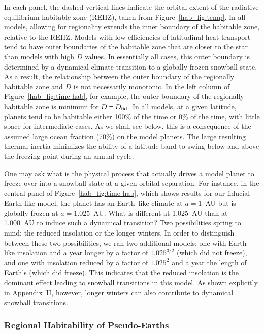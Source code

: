 In each panel, the dashed vertical lines indicate the orbital extent
of the radiative equilibrium habitable zone (REHZ), taken from
Figure~\ref{hab_fig:temp}.  In all models, allowing for regionality
extends the inner boundary of the habitable zone, relative to the
REHZ.  Models with low efficiencies of latitudinal heat transport tend
to have outer boundaries of the habitable zone that are closer to the
star than models with high $D$ values.  In essentially all cases, this
outer boundary is determined by a dynamical climate transition to a
globally-frozen snowball state. As a result, the relationship between
the outer boundary of the regionally habitable zone and $D$ is not
necessarily monotonic.  In the left column of Figure~\ref{hab_fig:time
hab}, for example, the outer boundary of the regionally habitable zone
is minimum for $D=D_{\rm fid}$.  In all models, at a given latitude,
planets tend to be habitable either 100\% of the time or 0\% of the
time, with little space for intermediate cases.  As we shall see
below, this is a consequence of the assumed large ocean fraction
(70\%) on the model planets. The large resulting thermal inertia
minimizes the ability of a latitude band to swing below and above the
freezing point during an annual cycle.

One may ask what is the physical process that actually drives a model
planet to freeze over into a snowball state at a given orbital
separation.  For instance, in the central panel of
Figure~\ref{hab_fig:time hab}, which shows results for our fiducial
Earth-like model, the planet has an Earth--like climate at $a=1$~AU
but is globally-frozen at $a=1.025$~AU.  What is different at 1.025~AU
than at 1.000~AU to induce such a dynamical transition?  Two
possibilities spring to mind: the reduced insolation or the longer
winters.  In order to distinguish between these two possibilities, we
ran two additional models: one with Earth--like insolation and a year
longer by a factor of $1.025^{3/2}$ (which did not freeze), and one
with insolation reduced by a factor of $1.025^2$ and a year the length
of Earth's (which did freeze).  This indicates that the reduced
insolation is the dominant effect leading to snowball transitions in
this model. As shown explicitly in Appendix~II, however, longer
winters can also contribute to dynamical snowball transitions.
 

\subsubsection{Regional Habitability of Pseudo-Earths}
\label{hab_sssec:f_lat}

